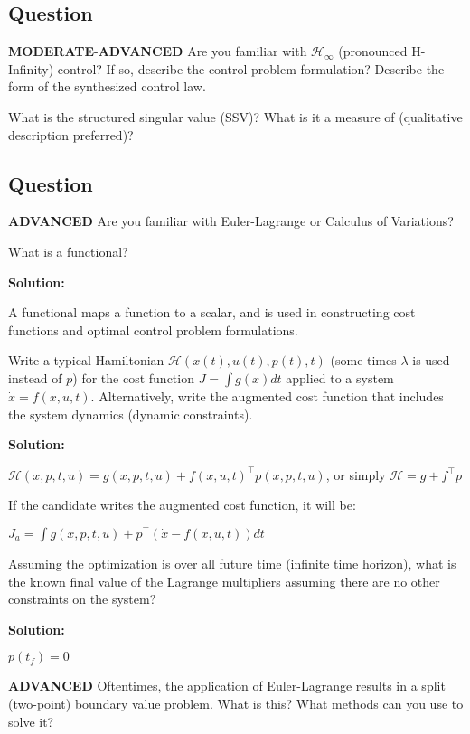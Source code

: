 \documentclass{article}
\newenvironment{Solution}{
\begin{tcolorbox}
\color{purple}
\textbf{Solution:}
}
{
\end{tcolorbox}
\ignorespacesafterend
}
\newcommand{\RatingBase}[2]{\textcolor{#1}{{\fontfamily{phv}\selectfont\textbf{#2}}}}
\newcommand{\Moderate}{\RatingBase{yellow!50!black!50}{MODERATE}}
\newcommand{\Advanced}{\RatingBase{red!50!black!50}{ADVANCED}}
\begin{document}
\subsection{Question}
\Moderate{}-\Advanced{} Are you familiar with $\mathcal{H}_\infty$  (pronounced H-Infinity) control?  If so, describe the control problem formulation?  Describe the form of the synthesized control law.  

What is the structured singular value (SSV)?  What is it a measure of (qualitative description preferred)? 
 
\subsection{Question} \Advanced{}
Are you familiar with Euler-Lagrange or Calculus of Variations?

What is a functional?
\begin{Solution}
A functional maps a function to a scalar, and is used in constructing cost functions and optimal control problem formulations.
\end{Solution}


Write a typical Hamiltonian $\mathscr{H}(x(t), u(t), p(t),t)$ (some times $\lambda$ is used instead of $p$) for the cost function $J=\int{ g(x) dt}$ applied to a system $\dot{x}= f(x,u,t)$.  Alternatively, write the augmented cost function that includes the system dynamics (dynamic constraints).  

\begin{Solution}
$\mathscr{H}(x,p,t,u) =g(x,p,t,u) + f(x,u,t)^\top p(x,p,t,u)$, or simply $\mathscr{H} = g+f^\top p$

If the candidate writes the augmented cost function, it will be:

$J_a = \int{g(x,p,t,u) + p^\top (\dot{x}-f(x,u,t))}dt$
\end{Solution}


Assuming the optimization is over all future time (infinite time horizon), what is the known final value of the Lagrange multipliers assuming there are no other constraints on the system?
\begin{Solution}
$p(t_f)=0$
\end{Solution}


\Advanced{} Oftentimes, the application of Euler-Lagrange results in a split (two-point) boundary value problem.  What is this?  What methods can you use to solve it?
\end{document}
